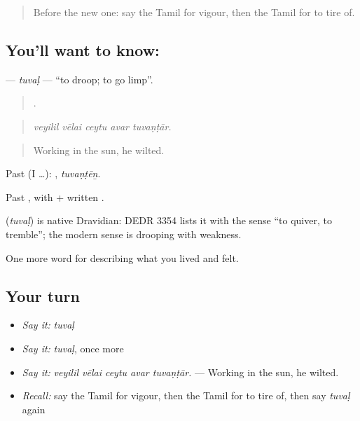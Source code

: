 \begin{quote}
Before the new one: say the Tamil for vigour, then the Tamil for to tire of.
\end{quote}

\subsection*{You'll want to know: }
\textbf{} — \emph{tuvaḷ} — \textquotedblleft{}to droop; to go limp\textquotedblright{}.

\begin{quote}
    .
\end{quote}

\begin{quote}
\emph{veyilil vēlai ceytu avar tuvaṇṭār.}
\end{quote}

\begin{quote}
Working in the sun, he wilted.
\end{quote}

Past (I …): , \emph{tuvaṇṭēṉ}.

Past , with  +  written .

\begin{cousinweb}
\textbf{} (\emph{tuvaḷ}) is native Dravidian: DEDR 3354 lists it with the sense \textquotedblleft{}to quiver, to tremble\textquotedblright{}; the modern sense is drooping with weakness.
\end{cousinweb}

\begin{grammarlens}[title={What you've built}]
One more word for describing what you lived and felt.
\end{grammarlens}

\subsection*{Your turn}
\begin{itemize}
\raggedright
  \item \emph{Say it:} \emph{tuvaḷ}
  \item \emph{Say it:} \emph{tuvaḷ}, once more
  \item \emph{Say it:} \emph{veyilil vēlai ceytu avar tuvaṇṭār.} — Working in the sun, he wilted.
  \item \emph{Recall:} say the Tamil for vigour, then the Tamil for to tire of, then say \emph{tuvaḷ} again
\end{itemize}

